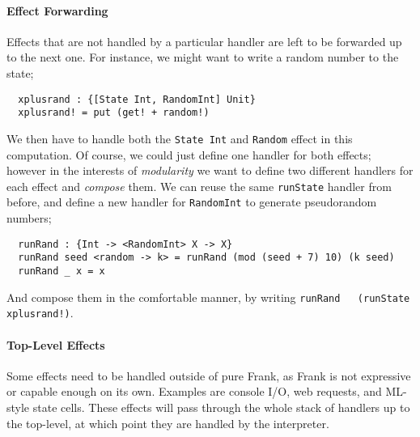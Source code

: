 \documentclass[msc,deptreport,cs]{infthesis} %
\newcommand{\code}[1]{\lstinline{#1}}
\newcommand{\todo}[1]
           {{\par\noindent\small\color{RoyalPurple}
  \framebox{\parbox{\dimexpr\linewidth-2\fboxsep-2\fboxrule}
    {\textbf{TODO:} #1}}}}
\begin{document}
\paragraph*{Effect Forwarding}

Effects that are not handled by a particular handler are left to be forwarded up
to the next one. For instance, we might want to write a random number to the
state;

\begin{lstlisting}
  xplusrand : {[State Int, RandomInt] Unit}
  xplusrand! = put (get! + random!)
\end{lstlisting}

\noindent We then have to handle both the \code{State Int} and \code{Random}
effect in this computation. Of course, we could just define one handler for both
effects; however in the interests of \emph{modularity} we want to define two
different handlers for each effect and \emph{compose} them. We can reuse the
same \code{runState} handler from before, and define a new handler for
\code{RandomInt} to generate pseudorandom numbers;

\begin{lstlisting}
  runRand : {Int -> <RandomInt> X -> X}
  runRand seed <random -> k> = runRand (mod (seed + 7) 10) (k seed)
  runRand _ x = x
\end{lstlisting}

\noindent And compose them in the comfortable manner, by writing \code{runRand
  (runState xplusrand!)}.



\paragraph*{Top-Level Effects}
Some effects need to be handled outside of pure Frank, as Frank is not
expressive or capable enough on its own. Examples are console I/O, web requests,
and ML-style state cells. These effects will pass through the whole stack of
handlers up to the top-level, at which point they are handled by the
interpreter.
\end{document}
